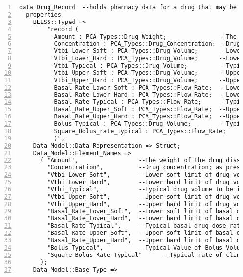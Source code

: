 \begin{lstlisting}[language=aadl, gobble=0, numbers=left, caption={\lstinline{PCA_Types} package}, label={listing:aadl:pca_types}]
data Drug_Record  --holds pharmacy data for a drug that may be used with the pump
  properties
    BLESS::Typed =>
		"record (
		  Amount : PCA_Types::Drug_Weight;               --The weight of the drug dissolved in the diluent (mg)
		  Concentration : PCA_Types::Drug_Concentration; --Drug concentration; as prescribed
		  Vtbi_Lower_Soft : PCA_Types::Drug_Volume;      --Lower soft limit of drug volume to be infused
		  Vtbi_Lower_Hard : PCA_Types::Drug_Volume;      --Lower hard limit of drug volume to be infused
		  Vtbi_Typical : PCA_Types::Drug_Volume;         --Typical drug volume to be infused
		  Vtbi_Upper_Soft : PCA_Types::Drug_Volume;      --Upper soft limit of drug volume to be infused
		  Vtbi_Upper_Hard : PCA_Types::Drug_Volume;      --Upper hard limit of drug volume to be infused
		  Basal_Rate_Lower_Soft : PCA_Types::Flow_Rate;  --Lower soft limit of basal drug dose rate
		  Basal_Rate_Lower_Hard : PCA_Types::Flow_Rate;  --Lower hard limit of basal drug dose rate
		  Basal_Rate_Typical : PCA_Types::Flow_Rate;     --Typical basal drug dose rate
		  Basal_Rate_Upper_Soft : PCA_Types::Flow_Rate;  --Upper soft limit of basal drug dose rate
		  Basal_Rate_Upper_Hard : PCA_Types::Flow_Rate;  --Upper hard limit of basal drug dose rate
		  Bolus_Typical : PCA_Types::Drug_Volume;        --Typical Value of Bolus Volume
		  Square_Bolus_rate_typical : PCA_Types::Flow_Rate;        --Typical duration of clinician commanded bolus
		  )";
    Data_Model::Data_Representation => Struct;
    Data_Model::Element_Names => 
      ( "Amount",                 --The weight of the drug dissolved in the diluent (mg)
    	"Concentration",          --Drug concentration; as prescribed
    	"Vtbi_Lower_Soft",        --Lower soft limit of drug volume to be infused
    	"Vtbi_Lower_Hard",        --Lower hard limit of drug volume to be infused
    	"Vtbi_Typical",           --Typical drug volume to be infused
    	"Vtbi_Upper_Soft",        --Upper soft limit of drug volume to be infused
    	"Vtbi_Upper_Hard",        --Upper hard limit of drug volume to be infused
    	"Basal_Rate_Lower_Soft",  --Lower soft limit of basal drug dose rate
    	"Basal_Rate_Lower_Hard",  --Lower hard limit of basal drug dose rate
    	"Basal_Rate_Typical",     --Typical basal drug dose rate
    	"Basal_Rate_Upper_Soft",  --Upper soft limit of basal drug dose rate
    	"Basal_Rate_Upper_Hard",  --Upper hard limit of basal drug dose rate
    	"Bolus_Typical",          --Typical Value of Bolus Volume
    	"Square_Bolus_Rate_Typical"      --Typical rate of clinician commanded bolus
      );
    Data_Model::Base_Type => 

\end{lstlisting}
